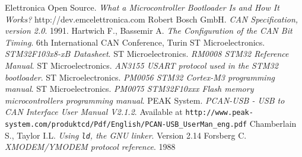 \documentclass[11pt]{article} %
\begin{document}
\clearpage
\begin{thebibliography}{9}
 Elettronica Open Source. \emph{What a Microcontroller Bootloader Is and How It Works?} http://dev.emcelettronica.com
 Robert Bosch GmbH. \emph{CAN Specification, version 2.0}. 1991.
 Hartwich F., Bassemir A. \emph{The Configuration of the CAN Bit Timing}. 6th International CAN Conference, Turin
 ST Microelectronics. \emph{STM32F103x8-xB Datasheet}.
 ST Microelectronics. \emph{RM0008 STM32 Reference Manual}.
 ST Microelectronics. \emph{AN3155 USART protocol used in the STM32 bootloader}.
 ST Microelectronics. \emph{PM0056 STM32 Cortex-M3 programming manual}.
 ST Microelectronics. \emph{PM0075 STM32F10xxx Flash memory microcontrollers programming manual}.
 PEAK System. \emph{PCAN-USB - USB to CAN Interface User Manual V2.1.2}. Available at \verb|http://www.peak-system.com/produktcd/Pdf/English/PCAN-USB_UserMan_eng.pdf|
 Chamberlain S., Taylor I.L. \emph{Using \texttt{ld}, the GNU linker}. Version 2.14
 Forsberg C. \emph{XMODEM/YMODEM protocol reference}. 1988
\end{thebibliography}

\end{document}
